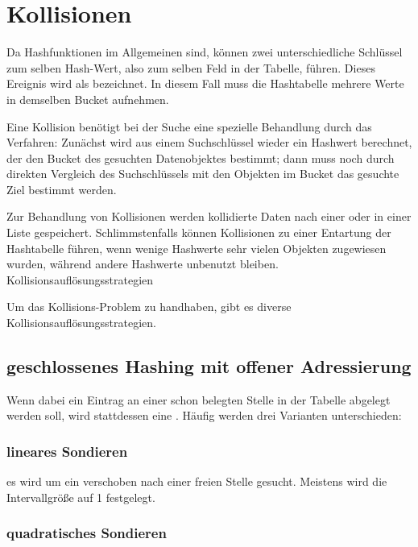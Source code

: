 \documentclass{lehramt-informatik-haupt}
\begin{document}
\section{Kollisionen}

Da Hashfunktionen im Allgemeinen  
sind, können zwei unterschiedliche Schlüssel zum selben Hash-Wert, also
zum selben Feld in der Tabelle, führen. Dieses Ereignis wird als
 bezeichnet. In diesem Fall muss die Hashtabelle
mehrere Werte in demselben Bucket aufnehmen.

Eine Kollision benötigt bei der Suche eine spezielle Behandlung durch
das Verfahren: Zunächst wird aus einem Suchschlüssel wieder ein Hashwert
berechnet, der den Bucket des gesuchten Datenobjektes bestimmt; dann
muss noch durch direkten Vergleich des Suchschlüssels mit den Objekten
im Bucket das gesuchte Ziel bestimmt werden.

Zur Behandlung von Kollisionen werden kollidierte Daten nach einer
 oder in einer Liste
gespeichert. Schlimmstenfalls können Kollisionen zu einer Entartung der
Hashtabelle führen, wenn wenige Hashwerte sehr vielen Objekten
zugewiesen wurden, während andere Hashwerte unbenutzt bleiben.
Kollisionsauflösungsstrategien

Um das Kollisions-Problem zu handhaben, gibt es diverse
Kollisionsauflösungsstrategien.

%

\subsection{geschlossenes Hashing mit offener Adressierung}

Wenn dabei ein Eintrag an einer schon belegten Stelle in der
Tabelle abgelegt werden soll, wird stattdessen eine . Häufig werden drei Varianten unterschieden:

\subsubsection{lineares Sondieren}

es wird um ein  verschoben nach einer freien
Stelle gesucht. Meistens wird die Intervallgröße auf 1 festgelegt.

\subsubsection{quadratisches Sondieren}
\end{document}

